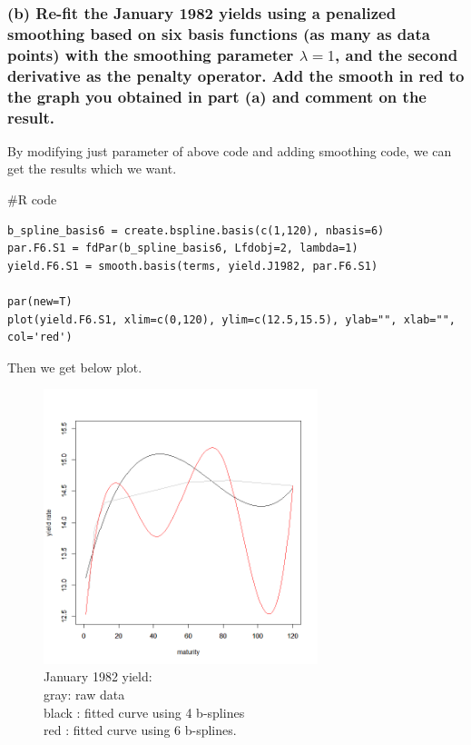 \documentclass{article}
\newenvironment{Rcode}%
{%
    \begin{mdframed}
    \#R code
    \begin{small}
}
{%
    \end{small}
    \end{mdframed}
}
\begin{document}
\newpage
\subsubsection*{(b) Re-fit the January 1982 yields using a penalized smoothing based on six basis functions 
(as many as data points) with the smoothing parameter $\lambda = 1$, 
and the second derivative as the penalty operator. Add the smooth in red to the graph you obtained 
in part (a) and comment on the result.}

By modifying just parameter of above code and adding smoothing code, we can get the results which we want.
\begin{Rcode}
    \begin{verbatim}
b_spline_basis6 = create.bspline.basis(c(1,120), nbasis=6)
par.F6.S1 = fdPar(b_spline_basis6, Lfdobj=2, lambda=1)
yield.F6.S1 = smooth.basis(terms, yield.J1982, par.F6.S1)

par(new=T)
plot(yield.F6.S1, xlim=c(0,120), ylim=c(12.5,15.5), ylab="", xlab="", col='red')
    \end{verbatim}
\end{Rcode}

Then we get below plot.

\begin{figure}[hh]
    \centering
    \includegraphics[height=8cm]{1982Jyield_raw_bspline4_bspline6.png}
    \caption{January 1982 yield: \\ gray: raw data \\ black : fitted curve using 4 b-splines \\ red : fitted curve using 6 b-splines.}
\end{figure}
\end{document}
